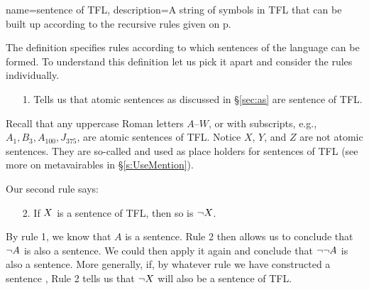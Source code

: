 
{
name=sentence of TFL,
description={A string of symbols in TFL that can be built up according to the recursive rules given on p.~\pageref{TFLsentences}}
}

The definition specifies rules according to which sentences of the language can be formed. To understand this definition let us pick it apart and consider the rules individually.



\begin{enumerate}
\item[1.] Tells us that atomic sentences as discussed in \S\ref{sec:as} are sentence of TFL.
\end{enumerate}
Recall that any uppercase Roman letters $A$--$W$, or with subscripts, e.g., $A_1, B_3, A_{100}, J_{375}$, are atomic sentences of TFL. Notice $X$, $Y$, and $Z$ are not atomic sentences. They are so-called  and used as place holders for sentences of TFL (see more on metavairables in \S\ref{s:UseMention}).



Our second rule says:
\begin{enumerate}
\item[2.]
If $X$ is a sentence of TFL, then so is $\neg X$.
\end{enumerate}
By rule 1, we know that $A$ is a sentence. Rule 2 then allows us to conclude that $\neg A$ is also a sentence. We could then apply it again and conclude that $\neg\neg A$ is also a sentence. More generally, if, by whatever rule we have constructed a sentence \metaX, Rule 2 tells us that $\neg X$ will also be a sentence of TFL.

